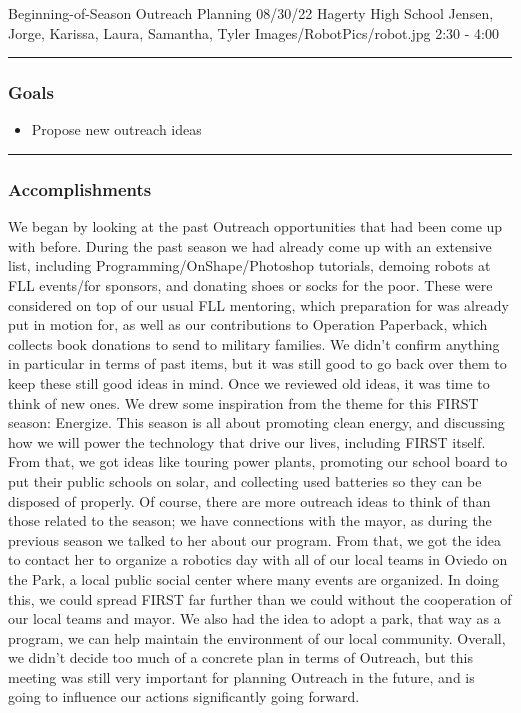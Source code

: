 \insertmeeting 
	{Beginning-of-Season Outreach Planning} 
	{08/30/22}
	{Hagerty High School}
	{Jensen, Jorge, Karissa, Laura, Samantha, Tyler}
	{Images/RobotPics/robot.jpg}
	{2:30 - 4:00}
	
\noindent\hfil\rule{\textwidth}{.4pt}\hfil
\subsubsection*{Goals}
\begin{itemize}
    \item Propose new outreach ideas

\end{itemize} 

\noindent\hfil\rule{\textwidth}{.4pt}\hfil

\subsubsection*{Accomplishments}
We began by looking at the past Outreach opportunities that had been come up with before. During the past season we had already come up with an extensive list, including Programming/OnShape/Photoshop tutorials, demoing robots at FLL events/for sponsors, and donating shoes or socks for the poor. These were considered on top of our usual FLL mentoring, which preparation for was already put in motion for, as well as our contributions to Operation Paperback, which collects book donations to send to military families. We didn't confirm anything in particular in terms of past items, but it was still good to go back over them to keep these still good ideas in mind. 
Once we reviewed old ideas, it was time to think of new ones. We drew some inspiration from the theme for this FIRST season: Energize. This season is all about promoting clean energy, and discussing how we will power the technology that drive our lives, including FIRST itself. From that, we got ideas like touring power plants, promoting our school board to put their public schools on solar, and collecting used batteries so they can be disposed of properly.
Of course, there are more outreach ideas to think of than those related to the season; we have connections with the mayor, as during the previous season we talked to her about our program. From that, we got the idea to contact her to organize a robotics day with all of our local teams in Oviedo on the Park, a local public social center where many events are organized. In doing this, we could spread FIRST far further than we could without the cooperation of our local teams and mayor. We also had the idea to adopt a park, that way as a program, we can help maintain the environment of our local community.
Overall, we didn't decide too much of a concrete plan in terms of Outreach, but this meeting was still very important for planning Outreach in the future, and is going to influence our actions significantly going forward.


